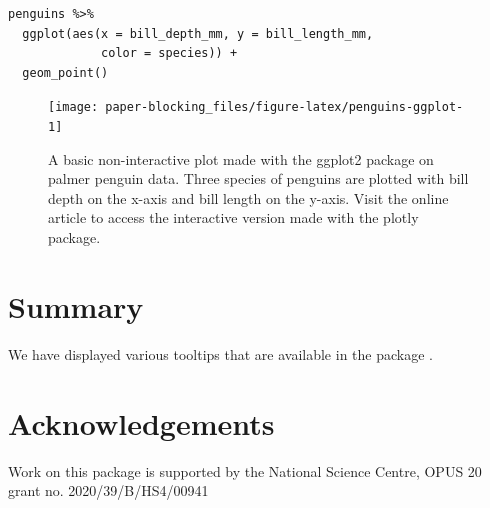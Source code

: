 \begin{verbatim}
penguins %>% 
  ggplot(aes(x = bill_depth_mm, y = bill_length_mm, 
             color = species)) + 
  geom_point()
\end{verbatim}

\begin{figure}
\texttt{[image: paper-blocking\_files/figure-latex/penguins-ggplot-1]} \caption{A basic non-interactive plot made with the ggplot2 package on palmer penguin data. Three species of penguins are plotted with bill depth on the x-axis and bill length on the y-axis. Visit the online article to access the interactive version made with the plotly package.}\label{fig:penguins-ggplot}
\end{figure}

\section{Summary}\label{summary}

We have displayed various tooltips that are available in the package .

\section{Acknowledgements}\label{acknowledgements}

Work on this package is supported by the National Science Centre, OPUS 20 grant no. 2020/39/B/HS4/00941



\address{%
Maciej Beręsewicz\\
University of Economics and BusinessStatisical Office in Poznań\\%
Department of Statistics, Poznań, Poland\\ Centre for the Methodology of Population Studies\\
%
\url{https://maciejberesewicz.com}\\%
\textit{ORCiD: \href{https://orcid.org/0000-0002-8281-4301}{0000-0002-8281-4301}}\\%
\href{mailto:maciej.beresewicz@poznan.pl}{\nolinkurl{maciej.beresewicz@poznan.pl}}%
}

\address{%
Adam Struzik\\
Adam Mickiewicz UniversityStatisical Office in Poznań\\%
Department of Mathematics, Poznań, Poland\\ Centre for Urban Statistics\\
%
%
%
\href{mailto:adastr5@st.amu.edu.pl}{\nolinkurl{adastr5@st.amu.edu.pl}}%
}
